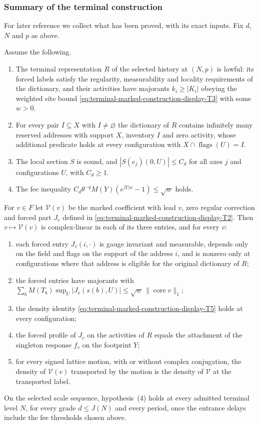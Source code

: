 \subsubsection{Summary of the terminal construction}
For later reference we collect what has been proved, with its exact
inputs. Fix $d$, $N$ and $p$ as above.

\begin{proposition}
\label{prop:terminal-marked-voice}
Assume the following.
\begin{enumerate}
\item The terminal representation $R$ of the selected history at $(N,p)$
  is lawful: its forced labels satisfy the regularity, measurability and
  locality requirements of the dictionary, and their activities have
  majorants $k_i\geq|K_i|$ obeying the weighted site bound \eqref{eq:terminal-marked-construction-display-T3} with
  some $w>0$.
\item For every pair $I\subseteq X$ with $I\neq\varnothing$ the
  dictionary of $R$ contains infinitely many reserved addresses with
  support $X$, inventory $I$ and zero activity, whose additional
  predicate holds at every configuration with
  $X\cap\operatorname{flags}(U)=I$.
\item The local section $S$ is sound, and
  $|S(e_j)(0,U)|\leq C_d$ for all axes $j$ and configurations $U$, with
  $C_d\geq1$.
\item The fee inequality
  $C_d\theta^{-q}M(Y)(e^{|Y|w}-1)\leq\sqrt w$ holds.
\end{enumerate}
For $v\in F$ let $\mathcal V(v)$ be the marked coefficient with lead
$v$, zero regular correction and forced part $J_v$ defined in \eqref{eq:terminal-marked-construction-display-T2}. Then
$v\mapsto\mathcal V(v)$ is complex-linear in each of its three entries,
and for every $v$:
\begin{enumerate}
\item each forced entry $J_v(i,\cdot)$ is gauge invariant and measurable,
  depends only on the field and flags on the support of the address $i$,
  and is nonzero only at configurations where that address is eligible
  for the original dictionary of $R$;
\item the forced entries have majorants with
  $\sum_bM(T_b)\sup_U|J_v(s(b),U)|
     \leq\sqrt w\,\|\operatorname{core}v\|_1$;
\item the density identity \eqref{eq:terminal-marked-construction-display-T5} holds at every configuration;
\item the forced profile of $J_v$ on the activities of $R$ equals the
  attachment of the singleton response $f_v$ on the footprint $Y$;
\item for every signed lattice motion, with or without complex
  conjugation, the density of $\mathcal V(v)$ transported by the motion
  is the density of $\mathcal V$ at the transported label.
\end{enumerate}
On the selected scale sequence, hypothesis~(4) holds at every admitted
terminal level $N$, for every grade $d\leq J(N)$ and every period, once
the entrance delays include the fee thresholds chosen above.
\end{proposition}
